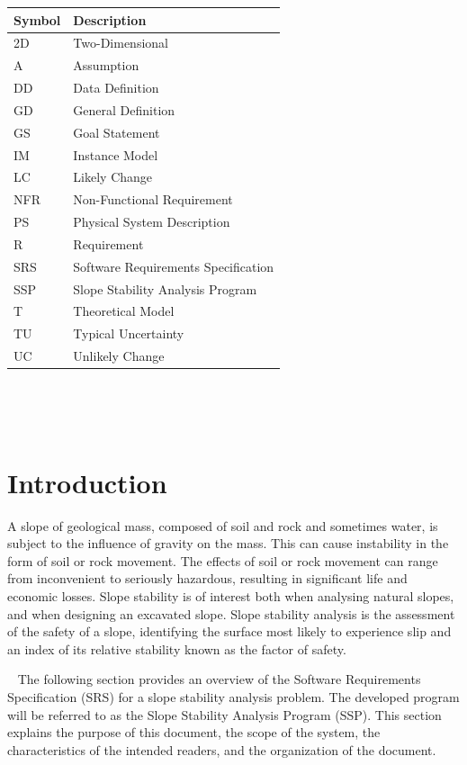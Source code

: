 \documentclass[12pt]{article}
\newcommand{\progname}{SSP}
\renewcommand{\arraystretch}{1}
\begin{document}
\renewcommand{\arraystretch}{1.2}
\begin{tabular}{l l} 
  \toprule		
  \textbf{Symbol} & \textbf{Description}\\
  \midrule 
  2D & Two-Dimensional\\
  A & Assumption\\
  DD & Data Definition\\
  GD & General Definition\\
  GS & Goal Statement\\
  IM & Instance Model\\
  LC & Likely Change\\
  NFR & Non-Functional Requirement\\
  PS & Physical System Description\\
  R & Requirement\\
  SRS & Software Requirements Specification\\
  \progname\ & Slope Stability Analysis Program\\
  T & Theoretical Model\\
  TU & Typical Uncertainty\\
  UC & Unlikely Change\\
  \bottomrule
\end{tabular}\\

\newpage

\tableofcontents

~\newpage


\setlength{\tabcolsep}{6pt}

\section{Introduction}

A slope of geological mass, composed of soil and rock and sometimes water, is 
subject to the influence of gravity on the mass. This can cause instability in 
the form of soil or rock movement. The effects of soil or rock movement can 
range from inconvenient to seriously hazardous, resulting in significant life 
and economic losses. Slope stability is of interest both when analysing natural 
slopes, and when designing an excavated slope. Slope stability analysis is the 
assessment of the safety of a slope, identifying the surface most likely to 
experience slip and an index of its relative stability known as the factor of 
safety.

~\newline
The following section provides an overview of the Software Requirements 
Specification (SRS) for a slope stability analysis problem. The developed 
program will be referred to as the Slope Stability Analysis Program 
(\progname). This section explains the purpose of this document, the 
scope of the system, the characteristics of the intended readers, and the 
organization of the document.
\end{document}
